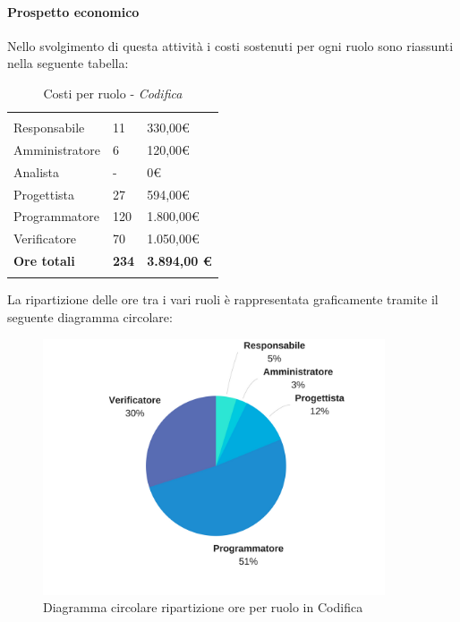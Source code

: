 			\paragraph{Prospetto economico} \Spazio
			Nello svolgimento di questa attività i costi sostenuti per ogni ruolo sono riassunti nella seguente tabella:
			\begin{table}[H]
				\centering
				\begin{tabular}{|p{4cm}|C{4cm}|C{4cm}|}
					
					 & &\\
					Responsabile & 11 & 330,00\euro \\
					\hline
					Amministratore& 6 & 120,00\euro \\
					\hline
					Analista & - & 0\euro \\
					\hline
					Progettista & 27 & 594,00\euro \\
					\hline
					Programmatore & 120 & 1.800,00\euro \\
					\hline
					Verificatore & 70 & 1.050,00\euro \\
					\hline
					\textbf{Ore totali} & \textbf{234} & \textbf{3.894,00 \euro} \\
				\end{tabular}
					\caption{Costi per ruolo - \textit{Codifica}}
			\end{table}
			
			La ripartizione delle ore tra i vari ruoli è rappresentata graficamente tramite il seguente diagramma circolare:

		\begin{figure}[H] 
			\centering 
			\includegraphics[width=0.9\textwidth]{images/CircolareCodifica.png} 
			\caption{Diagramma circolare ripartizione ore per ruolo in Codifica}
			\label{CircolareCodifica}
		\end{figure}
	
